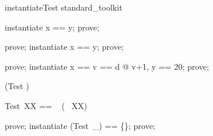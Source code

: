 \begin{zsection}
   \SECTION instantiateTest \parents standard\_toolkit
\end{zsection}

\begin{zproof}[prf1]
   instantiate x == y;
   prove;
\end{zproof}

\begin{zproof}[prf2]
   prove;
   instantiate x == y;
   prove;
\end{zproof}

\begin{zproof}[prf3]
   prove;
   instantiate x == \LET v == d @ v+1, y == 20;
   prove;
\end{zproof}

\begin{zed}
   \generic (Test \varg)
\end{zed}

\begin{zed}
   Test~XX == \power~  (\power~  XX)
\end{zed}

\begin{zproof}[prf4]
   prove;
   instantiate (Test~\_) == \{\};
   prove;
\end{zproof}

